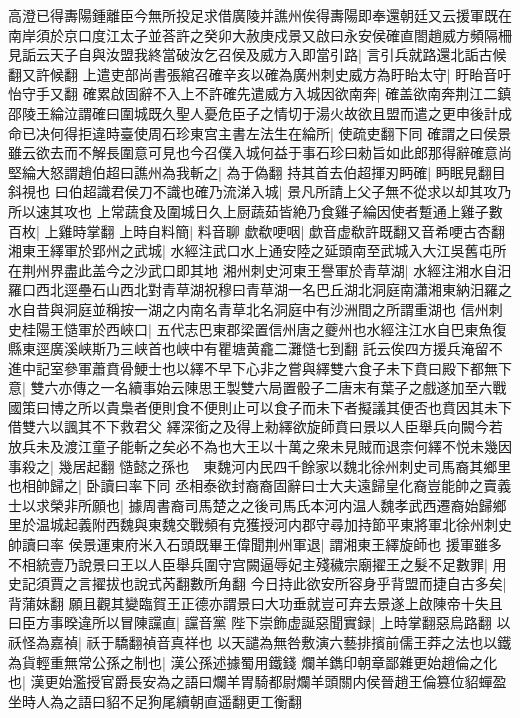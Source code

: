 高澄已得夀陽鍾離臣今無所投足求借廣陵并譙州俟得夀陽即奉還朝廷又云援軍既在南岸須於京口度江太子並荅許之癸卯大赦庚戍景又啟曰永安侯確直閤趙威方頻隔柵見詬云天子自與汝盟我終當破汝乞召侯及威方入即當引路|{
	言引兵就路還北詬古候翻又許候翻}
上遣吏部尚書張綰召確辛亥以確為廣州刺史威方為盱眙太守|{
	盱眙音吁怡守手又翻}
確累啟固辭不入上不許確先遣威方入城因欲南奔|{
	確盖欲南奔荆江二鎮}
邵陵王綸泣謂確曰圍城既久聖人憂危臣子之情切于湯火故欲且盟而遣之更申後計成命已决何得拒違時臺使周石珍東宫主書左法生在綸所|{
	使疏吏翻下同}
確謂之曰侯景雖云欲去而不解長圍意可見也今召僕入城何益于事石珍曰勑旨如此郎那得辭確意尚堅綸大怒謂趙伯超曰譙州為我斬之|{
	為于偽翻}
持其首去伯超揮刃眄確|{
	眄眠見翻目斜視也}
曰伯超識君侯刀不識也確乃流涕入城|{
	景凡所請上父子無不從求以却其攻乃所以速其攻也}
上常蔬食及圍城日久上厨蔬茹皆絶乃食雞子綸因使者蹔通上雞子數百枚|{
	上雞時掌翻}
上時自料簡|{
	料音聊}
歔欷哽咽|{
	歔音虚欷許既翻又音希哽古杏翻}
湘東王繹軍於郢州之武城|{
	水經注武口水上通安陸之延頭南至武城入大江吳舊屯所在荆州界盡此盖今之沙武口即其地}
湘州刺史河東王譽軍於青草湖|{
	水經注湘水自汨羅口西北逕壘石山西北對青草湖祝穆曰青草湖一名巴丘湖北洞庭南瀟湘東納汨羅之水自昔與洞庭並稱按一湖之内南名青草北名洞庭中有沙洲間之所謂重湖也}
信州刺史桂陽王慥軍於西峽口|{
	五代志巴東郡梁置信州唐之夔州也水經注江水自巴東魚復縣東逕廣溪峡斯乃三峡首也峡中有瞿塘黄龕二灘慥七到翻}
託云俟四方援兵淹留不進中記室參軍蕭賁骨鯁士也以繹不早下心非之嘗與繹雙六食子未下賁曰殿下都無下意|{
	雙六亦傳之一名續事始云陳思王製雙六局置骰子二唐末有葉子之戲遂加至六戰國策曰博之所以貴梟者便則食不便則止可以食子而未下者擬議其便否也賁因其未下借雙六以諷其不下救君父}
繹深銜之及得上勑繹欲旋師賁曰景以人臣舉兵向闕今若放兵未及渡江童子能斬之矣必不為也大王以十萬之衆未見賊而退柰何繹不悦未幾因事殺之|{
	幾居起翻}
慥懿之孫也　東魏河内民四千餘家以魏北徐州刺史司馬裔其鄉里也相帥歸之|{
	卧讀曰率下同}
丞相泰欲封裔裔固辭曰士大夫遠歸皇化裔豈能帥之賣義士以求榮非所願也|{
	據周書裔司馬楚之之後司馬氏本河内温人魏孝武西遷裔始歸鄉里於温城起義附西魏與東魏交戰頻有克獲授河内郡守尋加持節平東將軍北徐州刺史帥讀曰率}
侯景運東府米入石頭既畢王偉聞荆州軍退|{
	謂湘東王繹旋師也}
援軍雖多不相統壹乃說景曰王以人臣舉兵圍守宫闕逼辱妃主殘穢宗廟擢王之髮不足數罪|{
	用史記須賈之言擢拔也說式芮翻數所角翻}
今日持此欲安所容身乎背盟而捷自古多矣|{
	背蒲妺翻}
願且觀其變臨賀王正德亦謂景曰大功垂就豈可弃去景遂上啟陳帝十失且曰臣方事暌違所以冒陳讜直|{
	讜音黨}
陛下崇飾虚誕惡聞實録|{
	上時掌翻惡烏路翻}
以祅怪為嘉禎|{
	祅于驕翻禎音真祥也}
以天譴為無咎敷演六藝排擯前儒王莽之法也以鐵為貨輕重無常公孫之制也|{
	漢公孫述據蜀用鐵錢}
爛羊鐫印朝章鄙雜更始趙倫之化也|{
	漢更始濫授官爵長安為之語曰爛羊胃騎都尉爛羊頭關内侯晉趙王倫篡位貂蟬盈坐時人為之語曰貂不足狗尾續朝直遥翻更工衡翻}
